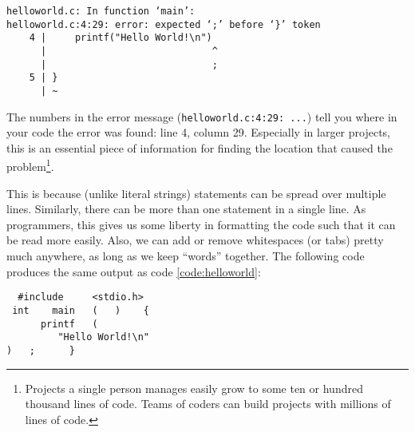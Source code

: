 \begin{cmdbox}
\begin{verbatim}
helloworld.c: In function ‘main’:
helloworld.c:4:29: error: expected ‘;’ before ‘}’ token
    4 |     printf("Hello World!\n")
      |                             ^
      |                             ;
    5 | }
      | ~
\end{verbatim}
\end{cmdbox}

The numbers in the error message (\texttt{helloworld.c:4:29: ...}) tell you where in your code the error was found: line 4, column 29. Especially in larger projects, this is an essential piece of information for finding the location that caused the problem\footnote{Projects a single person manages easily grow to some ten or hundred thousand lines of code. Teams of coders can build projects with millions of lines of code.}.

This is because (unlike literal strings) statements can be spread over multiple lines. Similarly, there can be more than one statement in a single line. As programmers, this gives us some liberty in formatting the code such that it can be read more easily. Also, we can add or remove whitespaces (or tabs) pretty much anywhere, as long as we keep \enquote{words} together. The following code produces the same output as code \ref{code:helloworld}:
\begin{codebox}[whitespaces.c]
\begin{verbatim}
  #include     <stdio.h>
 int    main   (   )    {
      printf   (   
         "Hello World!\n"
)   ;      }
\end{verbatim}
 \label{code:optionalWhitespaces}
\end{codebox}

